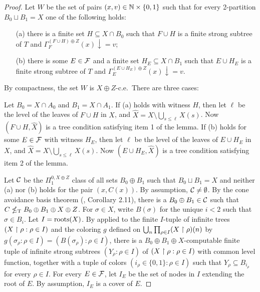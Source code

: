 \begin{proof}
Let $W$ be the set of pairs $(x, v) \in \mathbb{N} \times \{0,1\}$ such that for every 2-partition $B_0 \sqcup B_1 = X$ one of the following holds:
\begin{itemize}
	\item[(a)] there is a finite set $H \subseteq X \cap B_0$ such that $F \cup H$ is a finite strong subtree of $T$ and $\Gamma_F^{(F \cup H) \oplus Z}(x)\downarrow = v$;
	\item[(b)] there is some $E \in \mathcal{F}$ and a finite set $H_E \subseteq X \cap B_1$ such that $E \cup H_E$ is a finite strong subtree of $T$ and $\Gamma_E^{(E \cup H_E) \oplus Z}(x)\downarrow = v$.
\end{itemize}
By compactness, the set $W$ is $X \oplus Z$-c.e.\ There are three cases:

 Let $B_0 = X \cap A_0$ and $B_1 = X \cap A_1$. If (a) holds with witness $H$, then let $\ell$ be the level of the leaves of $F \cup H$ in $X$, and $\hat{X} = X \setminus \bigcup_{s \leq \ell} X(s)$. Now $(F \cup H, \hat{X})$ is a tree condition satisfying item 1 of the lemma.
If (b) holds for some $E \in \mathcal{F}$ with witness $H_E$, then let $\ell$ be the level of the leaves of $E \cup H_E$ in $X$, and $\hat{X} = X \setminus \bigcup_{s \leq \ell} X(s)$. Now $(E \cup H_E, \hat{X})$ is a tree condition satisfying item 2 of the lemma.

 Let $\mathcal{C}$ be the $\Pi^{0,X \oplus Z}_1$ class of all sets $B_0 \oplus B_1$ such that $B_0 \sqcup B_1 = X$ and neither (a) nor (b) holds for the pair $(x, C(x))$. By assumption, $\mathcal{C} \neq \emptyset$.
	By the cone avoidance basis theorem (\cite{Jockusch1972Degrees}, Corollary 2.11), there is a $B_0 \oplus B_1 \in \mathcal{C}$ such that $C \nleq_{\text{\upshape T}} B_0 \oplus B_1 \oplus X \oplus Z$. For $\sigma \in X$, write $B(\sigma)$ for the unique $i < 2$ such that $\sigma \in B_i$.
	Let $I = \operatorname{roots}(X)$.
	By  applied to the finite $I$-tuple of infinite trees $( X \upharpoonright \rho: \rho \in I )$ and the coloring $g$ defined on $\bigcup_n \prod_{\rho \in I} (X \upharpoonright \rho)(n)$ by $g(\sigma_\rho: \rho \in I) = (B(\sigma_\rho): \rho \in I)$, 
	there is a $B_0 \oplus B_1 \oplus X$-computable finite tuple of infinite strong subtrees $( Y_\rho: \rho \in I )$ of $( X \upharpoonright \rho: \rho \in I )$ with common level function, together with a tuple of colors $( i_\rho  \in \{0,1\}: \rho \in I )$ such that $Y_\rho \subseteq B_{i_\rho}$ for every $\rho \in I$. For every $E \in \mathcal{F}$, let $I_E$ be the set of nodes in $I$ extending the root of $E$. By assumption, $I_E$ is a cover of $E$.



\end{proof}
